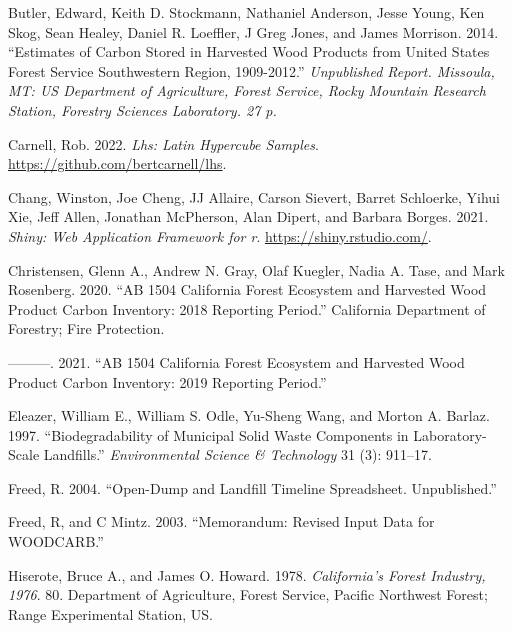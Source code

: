 \documentclass[
  openany]{book}
\newlength{\cslhangindent}
\newlength{\cslentryspacingunit} %
\newenvironment{CSLReferences}[2] %
 {%
  \setlength{\parindent}{0pt}
  \ifodd #1
  \let\oldpar\par
  \def\par{\hangindent=\cslhangindent\oldpar}
  \fi
  \setlength{\parskip}{#2\cslentryspacingunit}
 }%
 {}
\begin{document}
\begin{CSLReferences}{1}{0}
\leavevmode{}%
Butler, Edward, Keith D. Stockmann, Nathaniel Anderson, Jesse Young, Ken
Skog, Sean Healey, Daniel R. Loeffler, J Greg Jones, and James Morrison.
2014. {``Estimates of Carbon Stored in Harvested Wood Products from
United States Forest Service Southwestern Region, 1909-2012.''}
\emph{Unpublished Report. Missoula, MT: US Department of Agriculture,
Forest Service, Rocky Mountain Research Station, Forestry Sciences
Laboratory. 27 p.}

\leavevmode{}%
Carnell, Rob. 2022. \emph{Lhs: Latin Hypercube Samples}.
\url{https://github.com/bertcarnell/lhs}.

\leavevmode{}%
Chang, Winston, Joe Cheng, JJ Allaire, Carson Sievert, Barret Schloerke,
Yihui Xie, Jeff Allen, Jonathan McPherson, Alan Dipert, and Barbara
Borges. 2021. \emph{Shiny: Web Application Framework for r}.
\url{https://shiny.rstudio.com/}.

\leavevmode{}%
Christensen, Glenn A., Andrew N. Gray, Olaf Kuegler, Nadia A. Tase, and
Mark Rosenberg. 2020. {``AB 1504 California Forest Ecosystem and
Harvested Wood Product Carbon Inventory: 2018 Reporting Period.''}
California Department of Forestry; Fire Protection.

\leavevmode{}%
---------. 2021. {``AB 1504 California Forest Ecosystem and Harvested
Wood Product Carbon Inventory: 2019 Reporting Period.''}

\leavevmode{}%
Eleazer, William E., William S. Odle, Yu-Sheng Wang, and Morton A.
Barlaz. 1997. {``Biodegradability of Municipal Solid Waste Components in
Laboratory-Scale Landfills.''} \emph{Environmental Science \&
Technology} 31 (3): 911--17.

\leavevmode{}%
Freed, R. 2004. {``Open-Dump and Landfill Timeline Spreadsheet.
Unpublished.''}

\leavevmode{}%
Freed, R, and C Mintz. 2003. {``Memorandum: Revised Input Data for
WOODCARB.''}

\leavevmode{}%
Hiserote, Bruce A., and James O. Howard. 1978. \emph{California's Forest
Industry, 1976}. 80. Department of Agriculture, Forest Service, Pacific
Northwest Forest; Range Experimental Station, US.


\end{CSLReferences}
\end{document}
